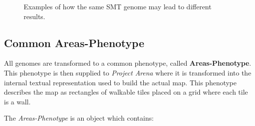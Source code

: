 \begin{figure}[hbt!]
    \centering
    \qquad
    \caption[SMT-Genome determinism]{Examples of how the same SMT genome may lead to different results.}
    \label{fig:smt_genome_determinism}
\end{figure}

\subsection{Common Areas-Phenotype}
All genomes are transformed to a common phenotype, called \textbf{Areas-Phenotype}. This phenotype is then supplied to \textit{Project Arena} where it is transformed into the internal textual representation used to build the actual map. This phenotype describes the map as rectangles of walkable tiles placed on a grid where each tile is a wall.

The \textit{Areas-Phenotype} is an object which contains:

